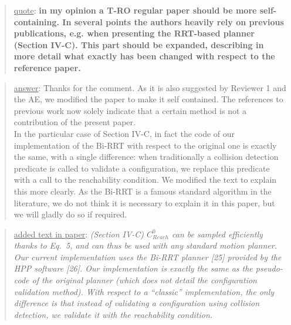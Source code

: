 \documentclass[a4paper]{article}
\newcommand{\done}[0]{}
\newcommand\quot[1]{\begin{quote} \underline{quote}: \textbf{#1}\end{quote}}
\newcommand\as[1]{\begin{quote} \underline{answer}: {#1}\end{quote} }
\newcommand\qt[1]{\begin{quote} \underline{added text in paper}: \textit{#1}\end{quote} \leavevmode \\ }
\begin{document}
\quot{in my opinion a T-RO regular paper should be more self-containing. In several points the authors heavily rely on previous publications, e.g. when presenting the RRT-based planner (Section IV-C). This part should be expanded, describing in more detail what exactly has been changed with respect to the reference paper. }
\as{Thanks for the comment. As it is also suggested by Reviewer 1 and the AE, we modified the paper to make it self contained. The references to previous work now solely indicate
that a certain method is not a contribution of the present paper. \\ 
In the particular case of Section IV-C, in fact the code of our implementation of the Bi-RRT with respect to the original one is exactly the same, with a single difference: when
traditionally a collision detection predicate is called to validate a configuration, we replace this predicate with a call to the reachability condition. We modified the text to explain this more clearly. As the Bi-RRT is a famous standard algorithm in the literature, we do not think it is necessary to explain it in this paper, but we will gladly do so if required. }
\qt{(Section IV-C) $C_{Reach}^0$ can be sampled efficiently thanks to Eq.~5, and can thus be used with any standard motion planner.
Our current implementation uses the Bi-RRT planner [25] provided by the HPP software [26].
Our implementation is exactly the same as the pseudo-code of the original planner (which does not detail the configuration validation method). With respect to a ``classic'' implementation, the only difference is that instead of validating a configuration using collision detection, we validate it with the \textit{reachability condition}.} \done
\end{document}
